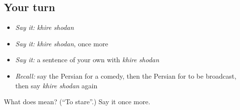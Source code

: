 \subsection*{Your turn}
\begin{itemize}
\raggedright
  \item \emph{Say it:} \emph{khire shodan}
  \item \emph{Say it:} \emph{khire shodan}, once more
  \item \emph{Say it:} a sentence of your own with \emph{khire shodan}
  \item \emph{Recall:} say the Persian for a comedy, then the Persian for to be broadcast, then say \emph{khire shodan} again
\end{itemize}

\begin{tcolorbox}[breakable,colback=teal!4,colframe=teal!35!black,title={Before you move on}]
What does   mean? (\textquotedblleft{}To stare\textquotedblright{}.) Say it once more.
\end{tcolorbox}
